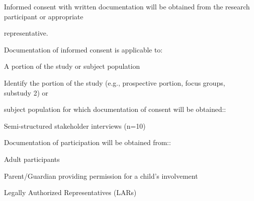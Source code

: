 \documentclass[10pt, letterpaper]{article}
\begin{document}
\noindent \makebox[0pt][l]{\color{columbiablue_official}$\boxtimes$}\hspace{1.2em} Informed consent with written documentation will be obtained from the research participant or appropriate

\begin{responsebox}

representative.

\vspace{0.5em}

\vspace{0.5em}

Documentation of informed consent is applicable to:

A portion of the study or subject population

\vspace{0.5em}

\vspace{0.5em}

Identify the portion of the study (e.g., prospective portion, focus groups, substudy 2) or

subject population for which documentation of consent will be obtained::

Semi-structured stakeholder interviews (n=10)

\vspace{0.5em}

\vspace{0.5em}

Documentation of participation will be obtained from::

\end{responsebox}

\noindent \makebox[0pt][l]{\color{columbiablue_official}$\boxtimes$}\hspace{1.2em} Adult participants

\noindent \makebox[0pt][l]{$\square$}\hspace{1.2em} Parent/Guardian providing permission for a child's involvement

\noindent \makebox[0pt][l]{$\square$}\hspace{1.2em} Legally Authorized Representatives (LARs)

\vspace{0.5em}

\vspace{0.5em}
\end{document}
